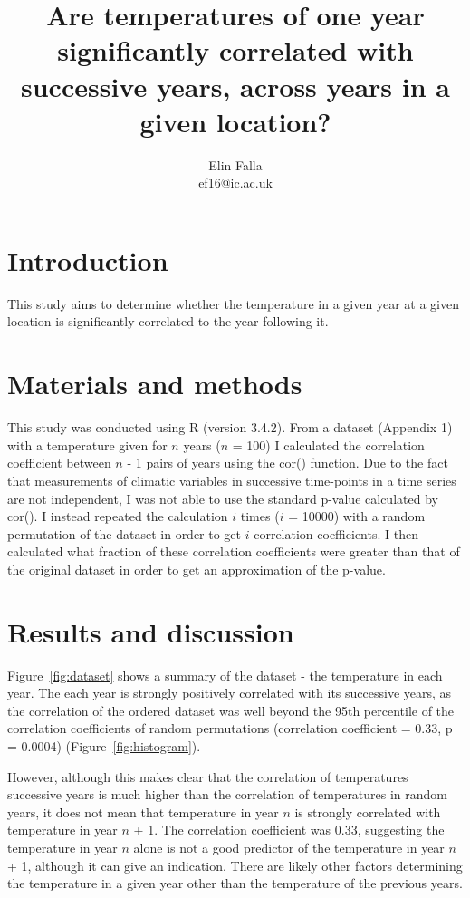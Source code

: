 \documentclass[12pt]{article}
\title{Are temperatures of one year significantly correlated with successive years, across years in a given location?}
\author{Elin Falla\\ef16@ic.ac.uk}
\date{}
\begin{document}
	\maketitle
	
	\section{Introduction}
		This study aims to determine whether the temperature in a given year at a given location is significantly correlated to the year following it.
		
	\section{Materials and methods}
		This study was conducted using R (version 3.4.2). From a dataset (Appendix 1) with a temperature given for $n$ years ($n$ = 100) I calculated the correlation coefficient between $n$ - 1 pairs of years using the cor() function. Due to the fact that measurements of climatic variables in successive time-points in a time series are not independent, I was not able to use the standard p-value calculated by cor(). I instead repeated the calculation $i$ times ($i$ = 10000) with a random permutation of the dataset in order to get $i$ correlation coefficients. I then calculated what fraction of these correlation coefficients were greater than that of the original dataset in order to get an approximation of the p-value.

	\section{Results and discussion}
		Figure~\ref{fig:dataset} shows a summary of the dataset - the temperature in each year. The each year is strongly positively correlated with its successive years, as the correlation of the ordered dataset was well beyond the 95th percentile of the correlation coefficients of random permutations (correlation coefficient = 0.33, p = 0.0004) (Figure~\ref{fig:histogram}).
		
		However, although this makes clear that the correlation of temperatures successive years is much higher than the correlation of temperatures in random years, it does not mean that temperature in year $n$ is strongly correlated with temperature in year $n$ + 1. The correlation coefficient was 0.33, suggesting the temperature in year $n$ alone is not a good predictor of the temperature in year $n$ + 1, although it can give an indication. There are likely other factors determining the temperature in a given year other than the temperature of the previous years.
		
\end{document}
